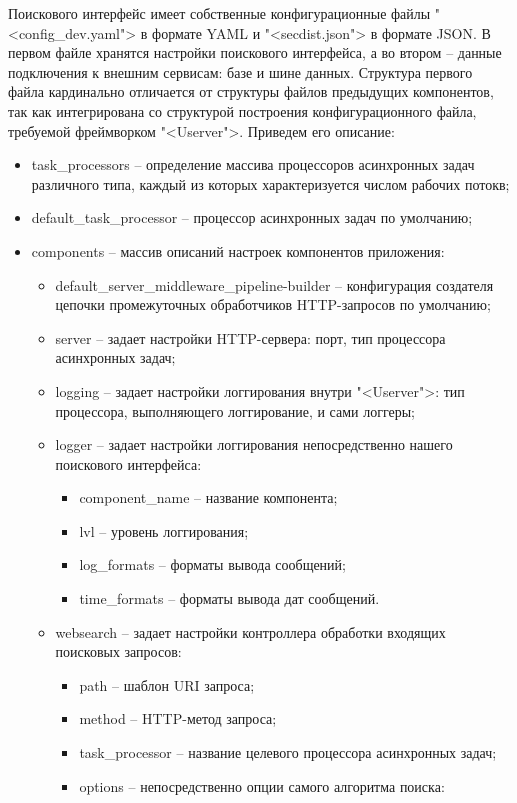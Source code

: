 Поискового интерфейс имеет собственные конфигурационные файлы "<config\_dev.yaml"> в формате YAML и "<secdist.json"> в формате JSON. В первом файле хранятся настройки поискового интерфейса, а во втором -- данные подключения к внешним сервисам: базе и шине данных. Структура первого файла кардинально отличается от структуры файлов предыдущих компонентов, так как интегрирована со структурой построения конфигурационного файла, требуемой фреймворком "<Userver">. Приведем его описание:
\begin{itemize}
\item task\_processors -- определение массива процессоров асинхронных задач различного типа, каждый из которых характеризуется числом рабочих потокв;
\item default\_task\_processor -- процессор асинхронных задач по умолчанию;
\item components -- массив описаний настроек компонентов приложения:
\begin{itemize}
\item default\_server\_middleware\_pipeline-builder -- конфигурация создателя цепочки промежуточных обработчиков HTTP-запросов по умолчанию;
\item server -- задает настройки HTTP-сервера: порт, тип процессора асинхронных задач;
\item logging -- задает настройки логгирования внутри "<Userver">: тип процессора, выполняющего логгирование, и сами логгеры;
\item logger -- задает настройки логгирования непосредственно нашего поискового интерфейса:
\begin{itemize}
\item component\_name -- название компонента;
\item lvl -- уровень логгирования;
\item log\_formats -- форматы вывода сообщений;
\item time\_formats -- форматы вывода дат сообщений.
\end{itemize}
\item websearch -- задает настройки контроллера обработки входящих поисковых запросов:
\begin{itemize}
\item path -- шаблон URI запроса;
\item method -- HTTP-метод запроса;
\item task\_processor -- название целевого процессора асинхронных задач;
\item options -- непосредственно опции самого алгоритма поиска:

\end{itemize}
\end{itemize}
\end{itemize}
